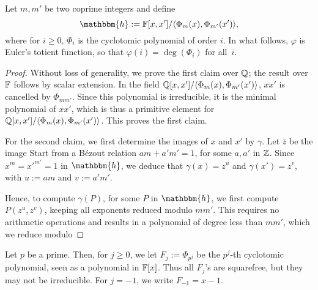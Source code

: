 Let $m,m'$ be two coprime integers and define
$$\mathbbm{h}:=\F[x,x']/\langle \Phi_{m}(x), \Phi_{m'}(x')\rangle,$$
where for $i \ge 0$, $\Phi_i$ is the cyclotomic polynomial of order
$i$. In what follows, $\varphi$ is Euler's totient function, so that
$\varphi(i) = \deg(\Phi_i)$ for all~$i$.
\begin{proof}
  Without loss of generality, we prove the first claim over $\mathbb{Q}$; the
  result over $\mathbb{F}$ follows by scalar extension. In the field \sloppy
  $\mathbb{Q}[x,x']/\langle \Phi_{m}(x), \Phi_{m'}(x')\rangle$, $xx'$ is
  cancelled by $\Phi_{mm'}$. Since this polynomial is irreducible, it
  is the minimal polynomial of $xx'$, which is thus a primitive
  element for $\mathbb{Q}[x,x']/\langle \Phi_{m}(x),
  \Phi_{m'}(x')\rangle$. This proves the first claim.

  For the second claim, we first determine the images of $x$ and $x'$
  by $\gamma$. Let $\bar z$ be the image Start from a B\'ezout
  relation $am+ a'm'=1$, for some $a,a'$ in $\Z$.  Since $x^m =
  {x'}^{m'}=1$ in $$, we deduce that $\gamma(x)=z^{u}$
  and $\gamma(x') = z^{v}$, with $u:=am$ and $v:=a'm'$.  

  Hence, to compute $\gamma(P)$, for some $P$ in $$, we
  first compute $P(z^u, z^v)$, keeping all exponents reduced modulo
  $mm'$. This requires no arithmetic operations and results in a
  polynomial of degree less than $mm'$, which we reduce modulo 
\end{proof}



  Let $p$ be a prime. Then, for $j $, we let
$F_j:=\Phi_{p^j}$ be the $p^j$-th cyclotomic polynomial, seen as a
polynomial in $\mathbb{F}[x]$. Thus all $F_j$'s are squarefree, but they may
not be irreducible. For $j=-1$, we write $F_{-1} = x-1$.

